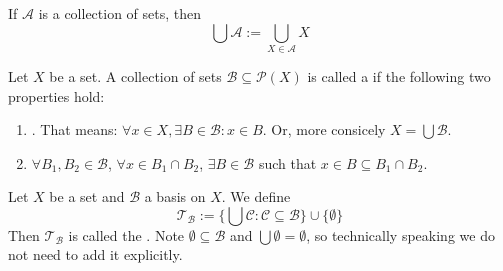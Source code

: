 \documentclass[12pt, a4paper, oneside, openright, titlepage]{book}
\begin{document}
\begin{remark}
    If $\mathcal{A}$ is a collection of sets, then \begin{equation*}
        \bigcup\mathcal{A} := \bigcup\limits_{X\in\mathcal{A}}X
    \end{equation*}
\end{remark}


\begin{definition}
    Let $X$ be a set. A collection of sets $\mathcal{B} \subseteq \mathcal{P}(X)$ is called a  if the following two properties hold:\begin{enumerate}
        \item {}. That means: $\forall x \in X, \exists B \in \mathcal{B}: x\in B$. Or, more consicely $X = \bigcup\mathcal{B}$.
        \item $\forall B_1,B_2 \in \mathcal{B}$, $\forall x \in B_1\cap B_2$, $\exists B \in \mathcal{B}$ such that $x \in B \subseteq B_1\cap B_2$.
    \end{enumerate}
\end{definition}


\begin{definition}
    Let $X$ be a set and $\mathcal{B}$ a basis on $X$. We define \begin{equation*}
        \mathcal{T}_{\mathcal{B}} :=\{\bigcup \mathcal{C}:\mathcal{C}\subseteq \mathcal{B}\}\cup\{\emptyset\}
    \end{equation*}
    Then $\mathcal{T}_{\mathcal{B}}$ is called the . Note $\emptyset \subseteq \mathcal{B}$ and $\bigcup\emptyset = \emptyset$, so technically speaking we do not need to add it explicitly.
\end{definition}
\end{document}
